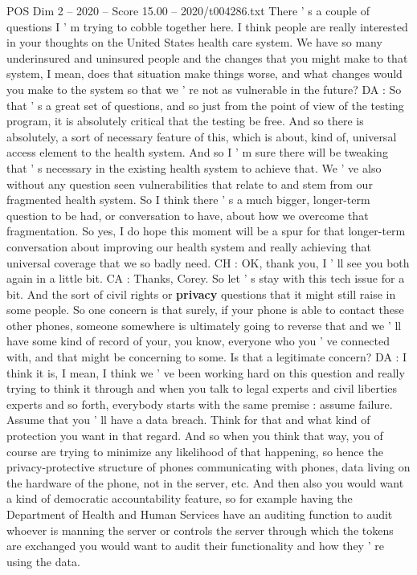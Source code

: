 \begin{textsample}{POS Dim 2 – 2020 – Score 15.00 – 2020/t004286.txt}
There ' s a couple of questions I ' m trying to cobble together here.
I think people are really interested in your thoughts on the United States health care system.
We have so many underinsured and uninsured people and the changes that you might make to that system, I mean, does that situation make things worse, and what changes would you make to the system so that we ' re not as vulnerable in the future?
DA : So that ' s a great set of questions, and so just from the point of view of the testing program, it is absolutely critical that the testing be free.
And so there is absolutely, a sort of necessary feature of this, which is about, kind of, universal access element to the health system.
And so I ' m sure there will be tweaking that ' s necessary in the existing health system to achieve that.
We ' ve also without any question seen vulnerabilities that relate to and stem from our fragmented health system.
So I think there ' s a much bigger, longer-term question to be had, or conversation to have, about how we overcome that fragmentation.
So yes, I do hope this moment will be a spur for that longer-term conversation about improving our health system and really achieving that universal coverage that we so badly need.
CH : OK, thank you, I ' ll see you both again in a little bit.
CA : Thanks, Corey.
So let ' s stay with this tech issue for a bit.
And the sort of civil rights or \textbf{privacy} questions that it might still raise in some people.
So one concern is that surely, if your phone is able to contact these other phones, someone somewhere is ultimately going to reverse that and we ' ll have some kind of record of your, you know, everyone who you ' ve connected with, and that might be concerning to some.
Is that a legitimate concern?
DA : I think it is, I mean, I think we ' ve been working hard on this question and really trying to think it through and when you talk to legal experts and civil liberties experts and so forth, everybody starts with the same premise : assume failure.
Assume that you ' ll have a data breach.
Think for that and what kind of protection you want in that regard.
And so when you think that way, you of course are trying to minimize any likelihood of that happening, so hence the privacy-protective structure of phones communicating with phones, data living on the hardware of the phone, not in the server, etc.
And then also you would want a kind of democratic accountability feature, so for example having the Department of Health and Human Services have an auditing function to audit whoever is manning the server or controls the server through which the tokens are exchanged you would want to audit their functionality and how they ' re using the data.

\end{textsample}
